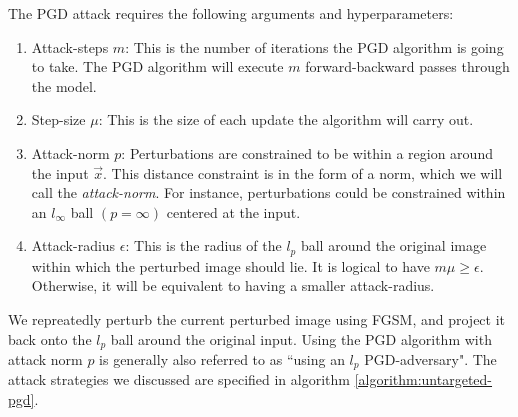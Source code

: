 \documentclass{ociamthesis}
\begin{document}
The PGD attack requires the following arguments and hyperparameters:

\begin{enumerate}
    \item Attack-steps $m$: This is the number of iterations the PGD algorithm
    is going to take. The PGD algorithm will execute $m$ forward-backward passes
    through the model.
    \item Step-size $\mu$: This is the size of each update the algorithm will
    carry out.
    \item Attack-norm $p$: Perturbations are constrained to be within a region
    around the input $\vec{x}$. This distance constraint is in the form of a
    norm, which we will call the \emph{attack-norm}. For instance, perturbations
    could be constrained within an $l_\infty$ ball $(p=\infty)$ centered at the
    input.
    \item Attack-radius $\epsilon$: This is the radius of the $l_p$ ball around
    the original image within which the perturbed image should lie. It is
    logical to have $m\mu \geq \epsilon$. Otherwise, it will be equivalent to
    having a smaller attack-radius.
\end{enumerate}
We repreatedly perturb the current perturbed image using FGSM, and project it
back onto the $l_p$ ball around the original input. Using the PGD algorithm with
attack norm $p$ is generally also referred to as ``using an $l_p$
PGD-adversary". The attack strategies we discussed are specified in algorithm
\ref{algorithm:untargeted-pgd}.
\end{document}
